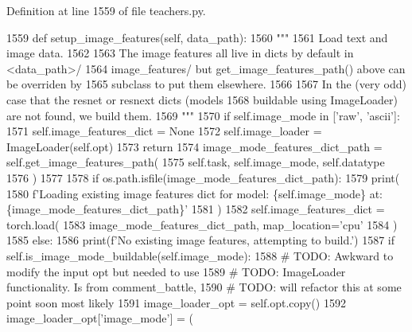 Definition at line 1559 of file teachers.\+py.


\begin{DoxyCode}
1559     \textcolor{keyword}{def }setup\_image\_features(self, data\_path):
1560         \textcolor{stringliteral}{"""}
1561 \textcolor{stringliteral}{        Load text and image data.}
1562 \textcolor{stringliteral}{}
1563 \textcolor{stringliteral}{        The image features all live in dicts by default in <data\_path>/}
1564 \textcolor{stringliteral}{        image\_features/ but get\_image\_features\_path() above can be overriden by}
1565 \textcolor{stringliteral}{        subclass to put them elsewhere.}
1566 \textcolor{stringliteral}{}
1567 \textcolor{stringliteral}{        In the (very odd) case that the resnet or resnext dicts (models}
1568 \textcolor{stringliteral}{        buildable using ImageLoader) are not found, we build them.}
1569 \textcolor{stringliteral}{        """}
1570         \textcolor{keywordflow}{if} self.image\_mode \textcolor{keywordflow}{in} [\textcolor{stringliteral}{'raw'}, \textcolor{stringliteral}{'ascii'}]:
1571             self.image\_features\_dict = \textcolor{keywordtype}{None}
1572             self.image\_loader = ImageLoader(self.opt)
1573             \textcolor{keywordflow}{return}
1574         image\_mode\_features\_dict\_path = self.get\_image\_features\_path(
1575             self.task, self.image\_mode, self.datatype
1576         )
1577 
1578         \textcolor{keywordflow}{if} os.path.isfile(image\_mode\_features\_dict\_path):
1579             print(
1580                 f\textcolor{stringliteral}{'Loading existing image features dict for model: \{self.image\_mode\} at:
       \{image\_mode\_features\_dict\_path\}'}
1581             )
1582             self.image\_features\_dict = torch.load(
1583                 image\_mode\_features\_dict\_path, map\_location=\textcolor{stringliteral}{'cpu'}
1584             )
1585         \textcolor{keywordflow}{else}:
1586             print(f\textcolor{stringliteral}{'No existing image features, attempting to build.'})
1587             \textcolor{keywordflow}{if} self.is\_image\_mode\_buildable(self.image\_mode):
1588                 \textcolor{comment}{# TODO: Awkward to modify the input opt but needed to use}
1589                 \textcolor{comment}{# TODO: ImageLoader functionality. Is from comment\_battle,}
1590                 \textcolor{comment}{# TODO: will refactor this at some point soon most likely}
1591                 image\_loader\_opt = self.opt.copy()
1592                 image\_loader\_opt[\textcolor{stringliteral}{'image\_mode'}] = (

\end{DoxyCode}
